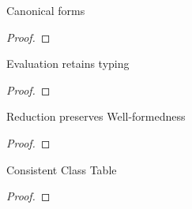\documentclass[acmlarge, anonymous, authordraft, review]{acmart} %
\begin{document}
\begin{lemma}{Canonical forms}{}
  \begin{conds}
    \cond{$\WFp\K{\e~\s}$}    
    \cond{$\EnvType\cdot\s\K\a\C$}
  \end{conds}

  \then\axiom{$\s[\a\mapsto{\obj\C{\b\a}}]$}

  \begin{proof} \innat
  \end{proof}
\end{lemma}

\begin{lemma}{Evaluation retains typing}{}
  \begin{conds}
    \cond{$\EnvType\cdot\s\K\e\t$}    
    \cond{$\EnvType\cdot\s\K\ep\tp$}
    \cond{$\WFp\K{\ep~\s}$}
    \cond{$\Reduce\K\ep\s\Kp\epp\sp$}
  \end{conds}

  \then{}

  \begin{proof} 
  \end{proof}
\end{lemma}

\begin{lemma}{Reduction preserves Well-formedness}{}
  \begin{conds}
    \cond{$\Reduce \K\e\s \Kp\ep\sp$}    
    \cond{$\WFp\K{\e~\s}$}
  \end{conds}

  \then\axiom{$\WFp\Kp{\ep~\sp}$}

  \begin{proof} 
  \end{proof}
\end{lemma}

\begin{lemma}{Consistent Class Table}{}
  \begin{conds}
    \cond{$\WFp\K{\e~\s}$}    
  \end{conds}

  \then{}

  \begin{proof} 
  \end{proof}
\end{lemma}
\end{document}

